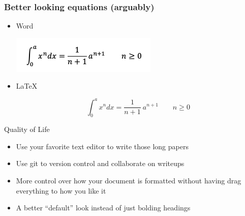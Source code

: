\documentclass{beamer}
\begin{document}
\begin{frame}[fragile]
  \frametitle{Better looking equations (arguably)}

  \begin{itemize}

  \item{Word}

  \includegraphics[scale=.75]{word-equation.png}

  \item{\LaTeX}

  \begin{equation}
  \int_0^a x^n dx = \frac{1}{n+1}\
  a^{n+1} \qquad n \geq 0
  \end{equation}

  \end{itemize}

\end{frame}

\begin{frame}{Quality of Life}
  \begin{itemize}
    \item {Use your favorite text editor to write those long papers}
    \item {Use git to version control and collaborate on writeups}
    \item {More control over how your document is formatted without having drag everything to how you like it}
    \item {A better ``default'' look instead of just bolding headings}
  \end{itemize}
\end{frame}
\end{document}
